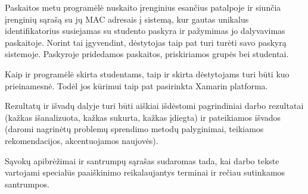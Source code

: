 \documentclass{VUMIFPSkursinis}
\begin{document}
Paskaitos metu programėlė nuskaito įrenginius esančius patalpoje ir siunčia įrenginių sąrašą su jų MAC adresais į sistemą, kur gautas unikalus identifikatorius susiejamas su studento paskyra ir pažymimas jo dalyvavimas paskaitoje. Norint tai įgyvendint, dėstytojas taip pat turi turėti savo paskyrą sistemoje. Paskyroje pridedamos paskaitos, priskiriamos grupės bei studentai.

Kaip ir programėlė skirta studentams, taip ir skirta dėstytojams turi būti kuo prieinamesnė. Todėl jos kūrimui taip pat pasirinkta Xamarin platforma.

Rezultatų ir išvadų dalyje turi būti aiškiai išdėstomi pagrindiniai darbo
rezultatai (kažkas išanalizuota, kažkas sukurta, kažkas įdiegta) ir pateikiamos
išvados (daromi nagrinėtų problemų sprendimo metodų palyginimai, teikiamos
rekomendacijos, akcentuojamos naujovės).

\printbibliography[heading=bibintoc]  %

Sąvokų apibrėžimai ir santrumpų sąrašas sudaromas tada, kai darbo tekste
vartojami specialūs paaiškinimo reikalaujantys terminai ir rečiau sutinkamos
santrumpos.

\appendix  %
\end{document}
